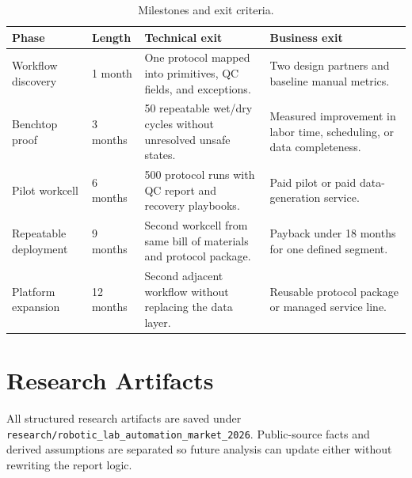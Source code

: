 \documentclass[11pt]{article}
\newcommand{\artifactroot}{\texttt{research/robotic\_lab\_automation\_market\_2026}}
\begin{document}
\begin{table}[htbp]
\centering
\small
\begin{tabularx}{\linewidth}{@{}L{2.6cm}L{2.0cm}YY@{}}
\toprule
\textbf{Phase} & \textbf{Length} & \textbf{Technical exit} & \textbf{Business exit} \\
\midrule
Workflow discovery & 1 month & One protocol mapped into primitives, QC fields, and exceptions. & Two design partners and baseline manual metrics. \\
Benchtop proof & 3 months & 50 repeatable wet/dry cycles without unresolved unsafe states. & Measured improvement in labor time, scheduling, or data completeness. \\
Pilot workcell & 6 months & 500 protocol runs with QC report and recovery playbooks. & Paid pilot or paid data-generation service. \\
Repeatable deployment & 9 months & Second workcell from same bill of materials and protocol package. & Payback under 18 months for one defined segment. \\
Platform expansion & 12 months & Second adjacent workflow without replacing the data layer. & Reusable protocol package or managed service line. \\
\bottomrule
\end{tabularx}
\caption{Milestones and exit criteria.}
\label{tab:roadmap}
\end{table}

\clearpage
\section{Research Artifacts}

All structured research artifacts are saved under \artifactroot. Public-source facts and derived assumptions are separated so future analysis can update either without rewriting the report logic.
\end{document}
